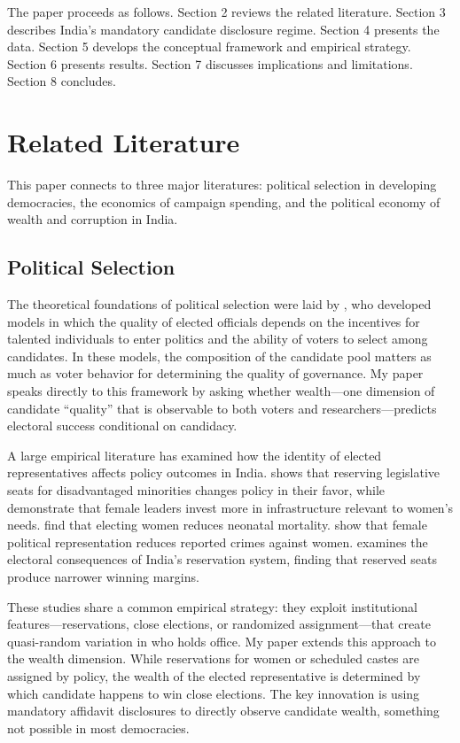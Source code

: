 \documentclass[12pt]{article}
\begin{document}
The paper proceeds as follows. Section 2 reviews the related literature. Section 3 describes India's mandatory candidate disclosure regime. Section 4 presents the data. Section 5 develops the conceptual framework and empirical strategy. Section 6 presents results. Section 7 discusses implications and limitations. Section 8 concludes.


\section{Related Literature}

This paper connects to three major literatures: political selection in developing democracies, the economics of campaign spending, and the political economy of wealth and corruption in India.

\subsection{Political Selection}

The theoretical foundations of political selection were laid by \citet{besley2005political}, who developed models in which the quality of elected officials depends on the incentives for talented individuals to enter politics and the ability of voters to select among candidates. In these models, the composition of the candidate pool matters as much as voter behavior for determining the quality of governance. My paper speaks directly to this framework by asking whether wealth---one dimension of candidate ``quality'' that is observable to both voters and researchers---predicts electoral success conditional on candidacy.

A large empirical literature has examined how the identity of elected representatives affects policy outcomes in India. \citet{pande2003can} shows that reserving legislative seats for disadvantaged minorities changes policy in their favor, while \citet{chattopadhyay2004women} demonstrate that female leaders invest more in infrastructure relevant to women's needs. \citet{bhalotra2014health} find that electing women reduces neonatal mortality. \citet{iyer2012effects} show that female political representation reduces reported crimes against women. \citet{jensenius2015power} examines the electoral consequences of India's reservation system, finding that reserved seats produce narrower winning margins.

These studies share a common empirical strategy: they exploit institutional features---reservations, close elections, or randomized assignment---that create quasi-random variation in who holds office. My paper extends this approach to the wealth dimension. While reservations for women or scheduled castes are assigned by policy, the wealth of the elected representative is determined by which candidate happens to win close elections. The key innovation is using mandatory affidavit disclosures to directly observe candidate wealth, something not possible in most democracies.
\end{document}
